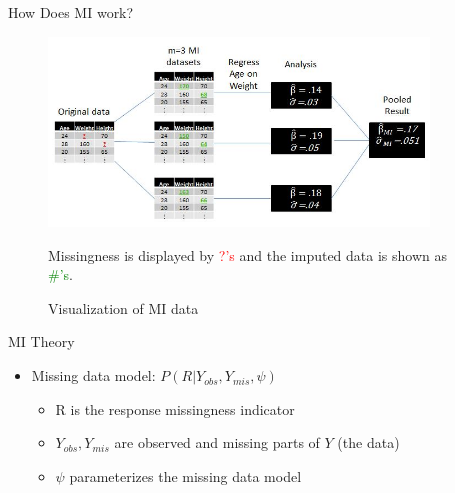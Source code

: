 \begin{frame}{How Does MI work?}
 \begin{figure}[h!]
  \centering
    \includegraphics[width=0.9\textwidth]{mi_example_full.jpg}
  \caption{Visualization of MI data}
\label{fig:miexample}
\medskip
\small
Missingness is displayed by \textcolor{red}{?'s} and the imputed data is shown  as \textcolor{green}{\#'s}.
\end{figure}
\end{frame}

\begin{frame}{MI Theory}
 \begin{itemize}
  \item Missing data model: $P(R|Y_{obs},Y_{mis},\psi)$
  \begin{itemize}
     \item R is the response missingness indicator
   \item $Y_{obs},Y_{mis}$ are observed and missing parts of $Y$ (the data)
   \item $\psi$ parameterizes the missing data model
  \end{itemize}

 \end{itemize}

\end{frame}


